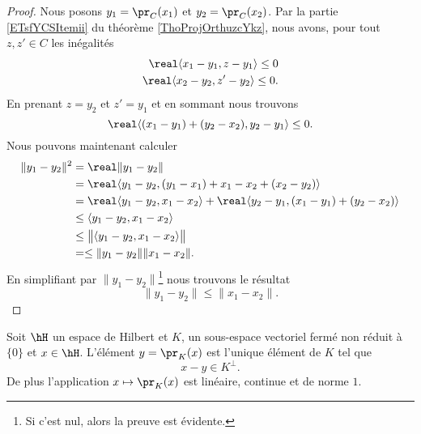 \begin{proof}
    Nous posons \( y_1=\pr_C(x_1)\) et \( y_2=\pr_C(x_2)\). Par la partie \ref{ETsfYCSItemii} du théorème \ref{ThoProjOrthuzcYkz}, nous avons, pour tout \( z,z'\in C\) les inégalités
    \begin{subequations}
        \begin{align}
            \real\langle x_1-y_1, z-y_1\rangle \leq 0\\
            \real\langle x_2-y_2, z'-y_2\rangle \leq 0.
        \end{align}
    \end{subequations}
    En prenant \( z=y_2\) et \( z'=y_1\) et en sommant nous trouvons
    \begin{equation}
        \real\langle (x_1-y_1)+(y_2-x_2), y_2-y_1\rangle \leq 0.
    \end{equation}
    Nous pouvons maintenant calculer
    \begin{equation}
        \begin{aligned}[]
            \| y_1-y_2 \|^2&=\real\| y_1-y_2 \|\\
            &=\real\langle y_1-y_2, (y_1-x_1)+x_1-x_2+(x_2-y_2)\rangle \\
            &=\real\langle y_1-y_2, x_1-x_2\rangle +\real\langle y_2-y_1, (x_1-y_1)+(y_2-x_2)\rangle \\
            &\leq\langle y_1-y_2, x_1-x_2\rangle \\
            &\leq\big\| \langle y_1-y_2, x_1-x_2\rangle  \big\|\\
            &=\leq \| y_1-y_2 \|\| x_1-x_2 \|.
        \end{aligned}
    \end{equation}
    En simplifiant par \( \| y_1-y_2 \|\)\footnote{Si c'est nul, alors la preuve est évidente.} nous trouvons le résultat
    \begin{equation}
        \| y_1-y_2 \|\leq \| x_1-x_2 \|.
    \end{equation}
\end{proof}

\begin{theorem}      \label{ThoMXwOjb}
    Soit \( \hH\) un espace de Hilbert et \( K\), un sous-espace vectoriel fermé non réduit à \( \{ 0 \}\) et \( x\in\hH\). L'élément \( y=\pr_K(x)\) est l'unique élément de \( K\) tel que
    \begin{equation}
        x-y\in K^{\perp}.
    \end{equation}
    De plus l'application \( x\mapsto\pr_K(x)\) est linéaire, continue et de norme \( 1\).
\end{theorem}

